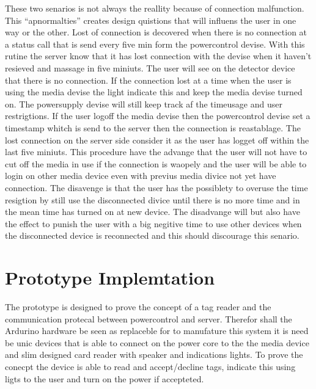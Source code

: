 These two senarios is not always the reallity because of connection malfunction. 
This "`apnormalties"' creates design quistions that will influens the user in one way or the other.   
Lost of connection is decovered when there is no connection at a status call that is send every five min form the powercontrol devise. With this rutine the server know that it has lost connection with the devise when it haven't resieved and massage in five miniuts. The user will see on the detector device that there is no connection. If the connection lost at a time when the user is using the media devise the light indicate this and keep the media devise turned on. The powersupply devise will still keep track af the timeusage and user restrigtions. If the user logoff the media devise then the powercontrol devise set a timestamp whitch is send to the server then the connection is reastablage. The lost connection on the server side consider it as the user has logget off within the last five miniuts. This procedure have the advange that the user will not have to cut off the media in use if the connection is waopely and the user will be able to login on other media device even with previus media divice not yet have connection. The disavenge is that the user has the possiblety to overuse the time resigtion by still use the disconnected divice until there is no more time and in the mean time has turned on at new device. The disadvange will but also have the effect to punish the user with a big negitive time to use other devices when the disconnected device is reconnected and this should discourage this senario. 

\section{Prototype Implemtation}
The prototype is designed to prove the concept of a tag reader and the communication protecal between powercontrol and server. Therefor shall the Ardurino hardware be seen as replaceble for to manufature this system it is need be unic devices that is able to connect on the power core to the the media device and slim designed card reader with speaker and indications lights. To prove the conecpt the device is able to read and accept/decline tags, indicate this using ligts to the user and turn on the power if accepteted.   

    